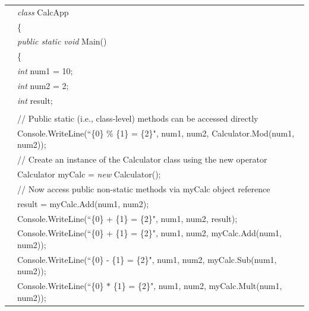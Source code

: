 \begin{program}
\begin{tabular}{>{\codelinenumfont}l>{\codelistingfont}l}
35 &  \hspace{0.2in} \emph{class} CalcApp \\
36 &  \hspace{0.2in} \{ \\
37 &  \hspace{0.4in} \emph{public static void} Main() \\
38 &  \hspace{0.4in} \{ \\
39 &  \hspace{0.6in} \emph{int} num1 = 10; \\
40 &  \hspace{0.6in} \emph{int} num2 = 2; \\
41 &  \hspace{0.6in} \emph{int} result; \\
42 & \\
43 & \hspace{0.6in} // Public static (i.e., class-level) methods can be accessed directly \\
44 &  \hspace{0.6in} Console.WriteLine(``\{0\} \% \{1\} = \{2\}", num1, num2, Calculator.Mod(num1, num2)); \\
45 & \hspace{0.6in} // Create an instance of the Calculator class using the new operator \\
46 & \hspace{0.6in} Calculator myCalc = \emph{new} Calculator(); \\
47 & \hspace{0.6in} // Now access public non-static methods via myCalc object reference \\
48 &  \hspace{0.6in} result = myCalc.Add(num1, num2); \\
49 &  \hspace{0.6in} Console.WriteLine(``\{0\} + \{1\} = \{2\}", num1, num2, result); \\
50 &  \hspace{0.6in} Console.WriteLine(``\{0\} + \{1\} = \{2\}", num1, num2, myCalc.Add(num1, num2)); \\
51 &  \hspace{0.6in} Console.WriteLine(``\{0\} - \{1\} = \{2\}", num1, num2, myCalc.Sub(num1, num2)); \\
52 &  \hspace{0.6in} Console.WriteLine(``\{0\} $\ast$ \{1\} = \{2\}", num1, num2, myCalc.Mult(num1, num2)); \\

\end{tabular}
\end{program}
